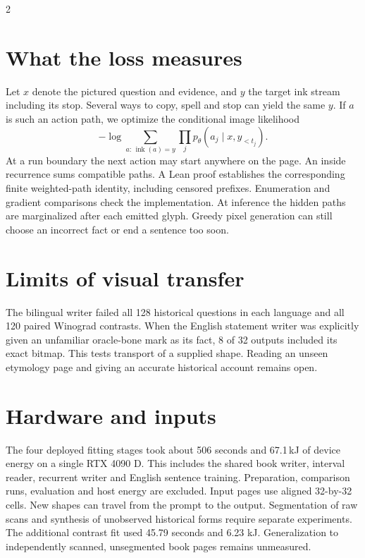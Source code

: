\documentclass[10pt,a4paper]{article}
\begin{document}
\begin{multicols}{2}
\section*{What the loss measures}
Let $x$ denote the pictured question and evidence, and $y$ the target ink stream including its stop. Several ways to copy, spell and stop can yield the same $y$. If $a$ is such an action path, we optimize the conditional image likelihood
\[
-\log\!\sum_{a:\,\operatorname{ink}(a)=y}
           \prod_j p_\theta(a_j\mid x,y_{<t_j}).
\]
At a run boundary the next action may start anywhere on the page. An inside recurrence sums compatible paths. A Lean proof establishes the corresponding finite weighted-path identity, including censored prefixes. Enumeration and gradient comparisons check the implementation. At inference the hidden paths are marginalized after each emitted glyph. Greedy pixel generation can still choose an incorrect fact or end a sentence too soon.
\section*{Limits of visual transfer}
The bilingual writer failed all 128 historical questions in each language and all 120 paired Winograd contrasts. When the English statement writer was explicitly given an unfamiliar oracle-bone mark as its fact, 8 of 32 outputs included its exact bitmap. This tests transport of a supplied shape. Reading an unseen etymology page and giving an accurate historical account remains open.
\section*{Hardware and inputs}
The four deployed fitting stages took about 506 seconds and 67.1\,kJ of device energy on a single RTX 4090 D. This includes the shared book writer, interval reader, recurrent writer and English sentence training. Preparation, comparison runs, evaluation and host energy are excluded. Input pages use aligned 32-by-32 cells. New shapes can travel from the prompt to the output. Segmentation of raw scans and synthesis of unobserved historical forms require separate experiments. The additional contrast fit used 45.79 seconds and 6.23 kJ. Generalization to independently scanned, unsegmented book pages remains unmeasured.
\end{multicols}
\end{document}
